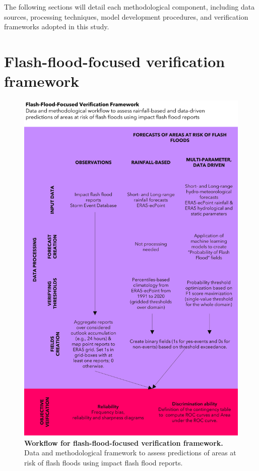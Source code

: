 The following sections will detail each methodological component, including data sources, processing techniques, model development procedures, and verification frameworks adopted in this study. 


\section{Flash-flood-focused verification framework}

\begin{figure}[htbp]
\centering
\includegraphics[width=\textwidth]{workflow_verif_framework.png}
\caption{\textbf{Workflow for flash-flood-focused verification framework.} Data and methodological framework to assess predictions of areas at risk of flash floods using impact flash flood reports.}
\label{fig:workflow_verif_framework}
\end{figure}

